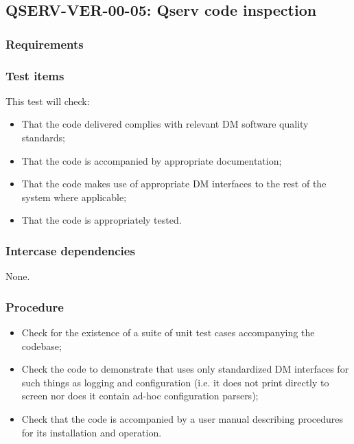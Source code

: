 \subsection{\textsc{QSERV-VER-00-05}: Qserv code inspection}
\label{qserv-ver-00-05}

\subsubsection{Requirements}

\subsubsection{Test items}

This test will check:

\begin{itemize}
  \item{That the code delivered complies with relevant DM software quality standards;}
  \item{That the code is accompanied by appropriate documentation;}
  \item{That the code makes use of appropriate DM interfaces to the rest of the system where applicable;}
  \item{That the code is appropriately tested.}
\end{itemize}

\subsubsection{Intercase dependencies}

None.

\subsubsection{Procedure}

\begin{itemize}

  \item{Check for the existence of a suite of unit test cases accompanying the codebase;}

  \item{Check the code to demonstrate that uses only standardized DM interfaces for such things as logging 
  and configuration (i.e. it does not print directly to screen nor does it contain ad-hoc configuration 
  parsers);}

  \item{Check that the code is accompanied by a user manual describing procedures for its installation and 
  operation.}

\end{itemize}
